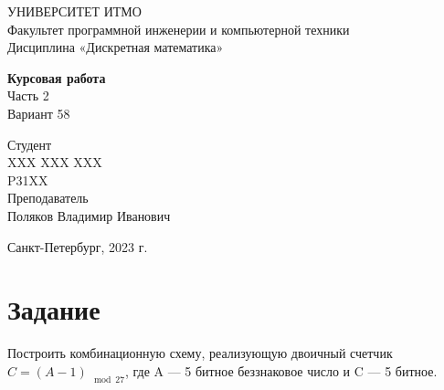 \documentclass{article}
\begin{document}
\begin{center}
    УНИВЕРСИТЕТ ИТМО \\
    Факультет программной инженерии и компьютерной техники \\
    Дисциплина «Дискретная математика»
    
    \vspace{5cm}

    \large
    \textbf{Курсовая работа} \\
    Часть 2 \\
    Вариант 58
\end{center}

\vspace{2cm}

\hfill\begin{minipage}{0.35\linewidth}
Студент \\
XXX XXX XXX \\
P31XX \\

Преподаватель \\
Поляков Владимир Иванович
\end{minipage}

\vfill

\begin{center}
    Санкт-Петербург, 2023 г.
\end{center}

\thispagestyle{empty}
\newpage

\section*{Задание}
Построить комбинационную схему, реализующую двоичный счетчик $C = (A - 1)_{\mod 27}$, где A --- 5 битное беззнаковое число и C --- 5 битное.
\end{document}
